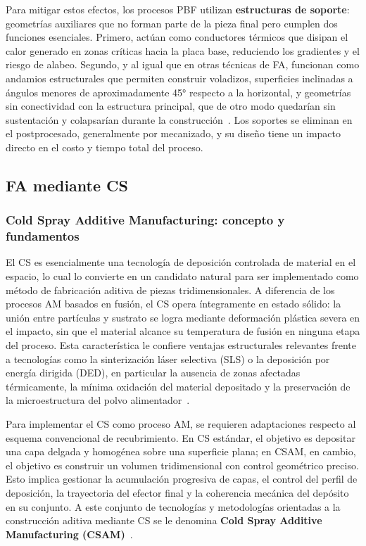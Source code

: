 Para mitigar estos efectos, los procesos PBF utilizan \textbf{estructuras 
	de soporte}: geometrías auxiliares que no 
forman parte de la pieza final pero cumplen dos funciones esenciales. 
Primero, actúan como conductores térmicos que disipan el calor generado 
en zonas críticas hacia la placa base, reduciendo los gradientes y el 
riesgo de alabeo. Segundo, y al igual que en otras técnicas de FA, funcionan como andamios estructurales que 
permiten construir voladizos, superficies inclinadas a ángulos menores 
de aproximadamente 45° respecto a la horizontal, y geometrías sin 
conectividad con la estructura principal, que de otro modo quedarían sin 
sustentación y colapsarían durante la construcción~\cite{Gibson2015}. 
Los soportes se eliminan en el postprocesado, generalmente por mecanizado, 
y su diseño tiene un impacto directo en el costo y tiempo total del proceso.

\subsection{FA mediante CS}

\subsubsection{Cold Spray Additive Manufacturing: concepto y fundamentos}

El CS es esencialmente una tecnología de deposición controlada de material en el
espacio, lo cual lo convierte en un candidato natural para ser implementado como
método de fabricación aditiva de piezas tridimensionales. A diferencia de los
procesos AM basados en fusión, el CS opera íntegramente en estado sólido: la
unión entre partículas y sustrato se logra mediante deformación plástica severa
en el impacto, sin que el material alcance su temperatura de fusión en ninguna
etapa del proceso. Esta característica le confiere ventajas estructurales
relevantes frente a tecnologías como la sinterización láser selectiva (SLS) o la
deposición por energía dirigida (DED), en particular la ausencia de zonas
afectadas térmicamente, la mínima oxidación del material depositado y la
preservación de la microestructura del polvo
alimentador~\cite{Papyrin2007, Gibson2015}.

Para implementar el CS como proceso AM, se requieren adaptaciones respecto al
esquema convencional de recubrimiento. En CS estándar, el objetivo es depositar
una capa delgada y homogénea sobre una superficie plana; en CSAM, en cambio, el
objetivo es construir un volumen tridimensional con control geométrico preciso.
Esto implica gestionar la acumulación progresiva de capas, el control del perfil
de deposición, la trayectoria del efector final y la coherencia mecánica del
depósito en su conjunto. A este conjunto de tecnologías y metodologías orientadas
a la construcción aditiva mediante CS se le denomina \textbf{Cold Spray Additive
	Manufacturing (CSAM)}~\cite{Moridi2014, Champagne2016unique}.

